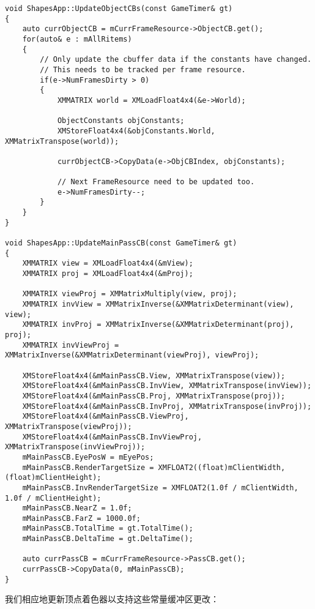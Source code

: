 \begin{lstlisting}
void ShapesApp::UpdateObjectCBs(const GameTimer& gt)
{
    auto currObjectCB = mCurrFrameResource->ObjectCB.get();
    for(auto& e : mAllRitems)
    {
        // Only update the cbuffer data if the constants have changed.  
        // This needs to be tracked per frame resource.
        if(e->NumFramesDirty > 0)
        {
            XMMATRIX world = XMLoadFloat4x4(&e->World);

            ObjectConstants objConstants;
            XMStoreFloat4x4(&objConstants.World, XMMatrixTranspose(world));

            currObjectCB->CopyData(e->ObjCBIndex, objConstants);

            // Next FrameResource need to be updated too.
            e->NumFramesDirty--;
        }
    }
}

void ShapesApp::UpdateMainPassCB(const GameTimer& gt)
{
    XMMATRIX view = XMLoadFloat4x4(&mView);
    XMMATRIX proj = XMLoadFloat4x4(&mProj);

    XMMATRIX viewProj = XMMatrixMultiply(view, proj);
    XMMATRIX invView = XMMatrixInverse(&XMMatrixDeterminant(view), view);
    XMMATRIX invProj = XMMatrixInverse(&XMMatrixDeterminant(proj), proj);
    XMMATRIX invViewProj = XMMatrixInverse(&XMMatrixDeterminant(viewProj), viewProj);

    XMStoreFloat4x4(&mMainPassCB.View, XMMatrixTranspose(view));
    XMStoreFloat4x4(&mMainPassCB.InvView, XMMatrixTranspose(invView));
    XMStoreFloat4x4(&mMainPassCB.Proj, XMMatrixTranspose(proj));
    XMStoreFloat4x4(&mMainPassCB.InvProj, XMMatrixTranspose(invProj));
    XMStoreFloat4x4(&mMainPassCB.ViewProj, XMMatrixTranspose(viewProj));
    XMStoreFloat4x4(&mMainPassCB.InvViewProj, XMMatrixTranspose(invViewProj));
    mMainPassCB.EyePosW = mEyePos;
    mMainPassCB.RenderTargetSize = XMFLOAT2((float)mClientWidth, (float)mClientHeight);
    mMainPassCB.InvRenderTargetSize = XMFLOAT2(1.0f / mClientWidth, 1.0f / mClientHeight);
    mMainPassCB.NearZ = 1.0f;
    mMainPassCB.FarZ = 1000.0f;
    mMainPassCB.TotalTime = gt.TotalTime();
    mMainPassCB.DeltaTime = gt.DeltaTime();

    auto currPassCB = mCurrFrameResource->PassCB.get();
    currPassCB->CopyData(0, mMainPassCB);
}
\end{lstlisting}
\begin{flushleft}
我们相应地更新顶点着色器以支持这些常量缓冲区更改：\\
\end{flushleft}
